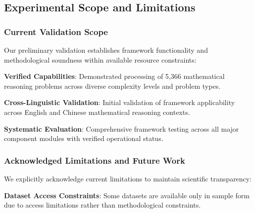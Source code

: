 \subsection{Experimental Scope and Limitations}

\subsubsection{Current Validation Scope}

Our preliminary validation establishes framework functionality and methodological soundness within available resource constraints:

\textbf{Verified Capabilities}: Demonstrated processing of 5,366 mathematical reasoning problems across diverse complexity levels and problem types.

\textbf{Cross-Linguistic Validation}: Initial validation of framework applicability across English and Chinese mathematical reasoning contexts.

\textbf{Systematic Evaluation}: Comprehensive framework testing across all major component modules with verified operational status.

\subsubsection{Acknowledged Limitations and Future Work}

We explicitly acknowledge current limitations to maintain scientific transparency:

\textbf{Dataset Access Constraints}: Some datasets are available only in sample form due to access limitations rather than methodological constraints.

